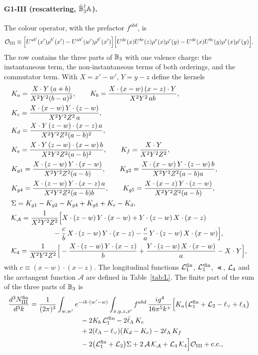 \paragraph*{G1-III (rescattering, $\bar{\mathbb{B}}_3^\dagger\mathbb{A}$).} The colour operator, with the prefactor $f^{abd}$, is
\begin{equation}
\mathcal{O}_{\rm III}\equiv\Big[U^{ab'}(x')\rho^{b'}(x')-U^{ab'}(w')\rho^{b'}(x')\Big]\Big[U^{de}(x)U^{bc}(z)\rho^e(x)\rho^c(y)-U^{de}(x)U^{bc}(y)\rho^e(x)\rho^c(y)\Big].
\end{equation}
The row contains the three parts of $\mathbb{B}_3$ with one valence charge: the instantaneous term, the non-instantaneous terms of both orderings, and the commutator term. With $X=x'-w'$, $Y=y-z$ define the kernels
\begin{align}
&K_a=\frac{X\cdot Y\,(a+b)}{X^2Y^2(b-a)^2},\qquad K_b=\frac{X\cdot(x-w)\,(x-z)\cdot Y}{X^2Y^2\,ab},\notag\\
&K_c=\frac{X\cdot(x-w)\,Y\cdot(z-w)}{X^2Y^2Z^2\,a},\notag\\
&K_d=\frac{X\cdot Y\,(z-w)\cdot(x-z)\,a}{X^2Y^2Z^2(a-b)^2},\notag\\
&K_e=\frac{X\cdot Y\,(z-w)\cdot(x-w)\,b}{X^2Y^2Z^2(a-b)^2},\qquad K_f=\frac{X\cdot Y}{X^2Y^2Z^2},\notag\\
&K_{g1}=\frac{X\cdot(z-w)\,Y\cdot(x-w)}{X^2Y^2Z^2(a-b)},\qquad K_{g2}=\frac{X\cdot(x-w)\,Y\cdot(z-w)\,b}{X^2Y^2Z^2(a-b)a},\notag\\
&K_{g4}=\frac{X\cdot(z-w)\,Y\cdot(x-z)\,a}{X^2Y^2Z^2(a-b)b},\qquad K_{g5}=\frac{X\cdot(x-z)\,Y\cdot(z-w)}{X^2Y^2Z^2(a-b)},\notag\\
&\Sigma=K_{g1}-K_{g2}-K_{g4}+K_{g5}+K_e-K_d,\notag\\
&\mathcal{K}_{\mathcal A}=\frac{1}{X^2Y^2Z^2}\Big[X\cdot(z-w)\,Y\cdot(x-w)+Y\cdot(z-w)\,X\cdot(x-z)\notag\\
&\hspace{6em}-\frac{c}{b}\,X\cdot(z-w)\,Y\cdot(x-z)-\frac{c}{a}\,Y\cdot(z-w)\,X\cdot(x-w)\Big],\notag\\
&\mathcal{K}_4=\frac{1}{X^2Y^2Z^2}\Big[-\frac{X\cdot(z-w)\,Y\cdot(x-z)}{b}+\frac{Y\cdot(z-w)\,X\cdot(x-w)}{a}-X\cdot Y\Big],
\end{align}
with $c\equiv(x-w)\cdot(x-z)$. The longitudinal functions $\mathcal{L}_{1}^{\rm fin}$, $\mathcal{L}_{1}'^{\rm fin}$, $\Lt$, $\mathcal{L}_{4}$ and the arctangent function $\mathcal A$ are defined in Table~\ref{tab:L}. The finite part of the sum of the three parts of $\mathbb{B}_3$ is
\begin{align}
\frac{d^3N^{\rm fin}_{\rm III}}{d^3k}={}&\frac{1}{(2\pi)^3}\int_{w,w'}e^{-ik\cdot(w'-w)}\int_{x,y,z,x'}f^{abd}\,\frac{ig^4}{16\pi^5k^+}\Big[K_a\big(\mathcal{L}_{1}^{\rm fin}+\mathcal{L}_{2}-\ell_{\vee}+\ell_{\Lambda}\big)\notag\\
&\hspace{6em}-2K_b\,\mathcal{L}_{1}'^{\rm fin}-2\bar\ell_{\Lambda}\,K_c\notag\\
&\hspace{6em}+2(\ell_{\Lambda}-\ell_{\vee})(K_d-K_e)-2\ell_{\Lambda}\,K_f\notag\\
&\hspace{6em}-2\big(\mathcal{L}_{1}^{\rm fin}+\mathcal{L}_{2}\big)\Sigma+2\,\mathcal A\,\mathcal{K}_{\mathcal A}+\mathcal{L}_{4}\,\mathcal{K}_4\Big]\mathcal{O}_{\rm III}+{\rm c.c.},
\label{eq:finIII}
\end{align}
